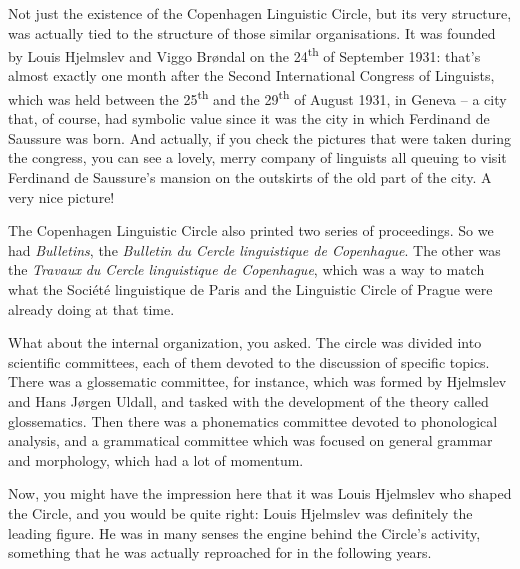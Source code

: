 \begin{styleStandard}
Not just the existence of the Copenhagen Linguistic Circle, but its very structure, was actually tied to the structure of those similar organisations. It was founded by Louis Hjelmslev and Viggo Brøndal on the 24\textsuperscript{th} of September 1931: that’s almost exactly one month after the Second International Congress of Linguists, which was held between the 25\textsuperscript{th} and the 29\textsuperscript{th} of August 1931, in Geneva – a city that, of course, had symbolic value since it was the city in which Ferdinand de Saussure was born. And actually, if you check the pictures that were taken during the congress, you can see a lovely, merry company of linguists all queuing to visit Ferdinand de Saussure’s mansion on the outskirts of the old part of the city. A very nice picture!
\end{styleStandard}

\begin{styleStandard}
The Copenhagen Linguistic Circle also printed two series of proceedings. So we had \textit{Bulletins}, the \textit{Bulletin du Cercle linguistique de Copenhague}. The other was the \textit{Travaux} \textit{du Cercle linguistique de Copenhague}, which was a way to match what the Société linguistique de Paris and the Linguistic Circle of Prague were already doing at that time. 
\end{styleStandard}

\begin{styleStandard}
What about the internal organization, you asked. The circle was divided into scientific committees, each of them devoted to the discussion of specific topics. There was a glossematic committee, for instance, which was formed by Hjelmslev and Hans Jørgen Uldall, and tasked with the development of the theory called glossematics. Then there was a phonematics committee devoted to phonological analysis, and a grammatical committee which was focused on general grammar and morphology, which had a lot of momentum. 
\end{styleStandard}

\begin{styleStandard}
Now, you might have the impression here that it was Louis Hjelmslev who shaped the Circle, and you would be quite right: Louis Hjelmslev was definitely the leading figure. He was in many senses the engine behind the Circle’s activity, something that he was actually reproached for in the following years. 
\end{styleStandard}

